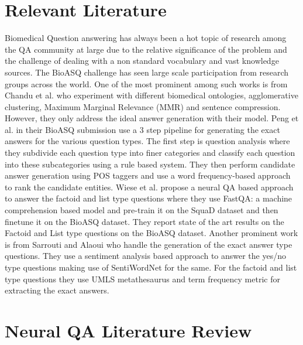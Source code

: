 
\section{Relevant Literature}
\label{lit}
Biomedical Question answering has always been a hot topic of research among the QA community at large due to the relative significance of the problem and the challenge of dealing with a non standard vocabulary and vast knowledge sources. The BioASQ challenge has seen large scale participation from research groups across the world. One of the most prominent among such works is from Chandu et al.  who experiment with different biomedical ontologies, agglomerative clustering, Maximum Marginal Relevance (MMR) and sentence compression. However, they only address the ideal answer generation with their model. Peng et al.  in their BioASQ submission use a 3 step pipeline for generating the exact answers for the various question types. The first step is question analysis where they subdivide each question type into finer categories and classify each question into these subcategories using a rule based system. They then perform candidate answer generation using POS taggers and use a word frequency-based approach to rank the candidate entities. Wiese et al.  propose a neural QA based approach to answer the factoid and list type questions where they use FastQA: a machine comprehension based model \cite{fastqa-squad} and pre-train it on the SquaD dataset \cite{squad} and then finetune it on the BioASQ dataset. They report state of the art results on the Factoid and List type questions on the BioASQ dataset. Another prominent work is from Sarrouti and Alaoui  who handle the generation of the exact answer type questions. They use a sentiment analysis based approach to answer the yes/no type questions making use of SentiWordNet for the same. For the factoid and list type questions they use UMLS metathesaurus and term frequency metric for extracting the exact answers. %


\section{Neural QA Literature Review}

